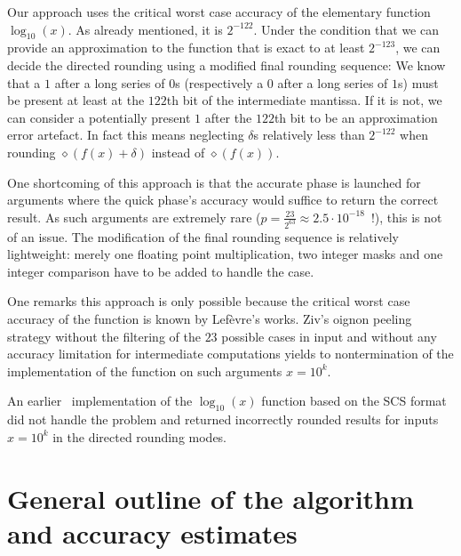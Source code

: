 Our approach uses the critical worst case accuracy of the
elementary function $\log_{10}\left( x \right)$. As already mentioned,
it is $2^{-122}$. Under the condition that we can provide an
approximation to the function that is exact to at least $2^{-123}$, we
can decide the directed rounding using a modified final rounding
sequence: We know that a $1$ after a long series of $0$s (respectively
a $0$ after a long series of $1$s) must be present at least at the
$122$th bit of the intermediate mantissa.  If it is not, we can
consider a potentially present $1$ after the $122$th bit to be an
approximation error artefact. In fact this means neglecting $\delta$s
relatively less than $2^{-122}$ when rounding $\diamond \left( f\left(
x \right) + \delta \right)$ instead of $\diamond \left( f\left( x
\right) \right)$. 

One shortcoming of this approach is that the
accurate phase is launched for arguments where the quick phase's
accuracy would suffice to return the correct result. As
such arguments are extremely rare ($p = \frac{23}{2^{63}} \approx 2.5
\cdot 10^{-18}$~!), this is not of an issue. The modification of the
final rounding sequence is relatively lightweight: merely one floating
point multiplication, two integer masks and one integer comparison
have to be added to handle the case.

One remarks this approach is only possible because the critical worst
case accuracy of the function is known by Lef{\`e}vre's works. Ziv's oignon peeling
strategy without the filtering of the
$23$ possible cases in input and without any accuracy limitation for
intermediate computations yields to nontermination of the
implementation of the function on such arguments $x = 10^k$.

An earlier \crlibm\ implementation of the $\log_{10}\left(x\right)$
function based on the SCS format did not handle the problem and
returned incorrectly rounded results for inputs $x = 10^k$ in the
directed rounding modes.


\section{General outline of the algorithm and accuracy estimates}\label{subsec:outlinelog10}
% 

